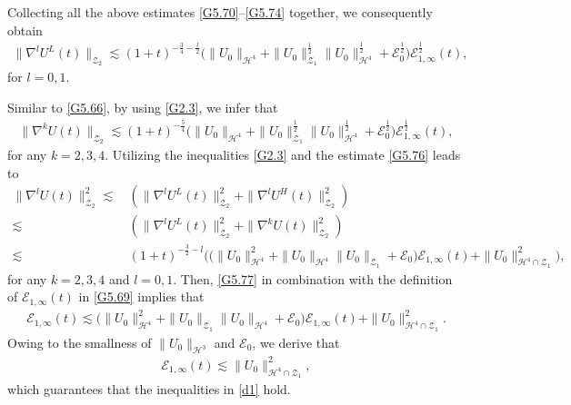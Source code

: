 \documentclass[reqno,11pt]{amsart}
\theoremstyle{plain}
\numberwithin{equation}{section}
\begin{document}
Collecting all the above estimates \eqref{G5.70}--\eqref{G5.74} together,
 we consequently obtain  
\begin{align}\label{G5.75}
\|\nabla^l U^L(t)\|_{\mathcal{Z}_2}\lesssim (1+t)^{-\frac{3}{4}-\frac{l}{2}} 
\big(\|U_0\|_{\mathcal{H}^4}
+\|U_0\|_{\mathcal{Z}_1}^{\frac{1}{2}}\|U_0\|_{\mathcal{H}^4}^{\frac{1}{2}}+\mathcal{E}^{\frac{1}{2}}_0  
 \big)\mathcal{E}^{\frac{1}{2}}_{1,\infty}(t),   
\end{align}
for $l=0,1$.

Similar to \eqref{G5.66}, by using \eqref{G2.3}, we   infer that
\begin{align}\label{G5.76}
\|\nabla^k U(t)\|_{\mathcal{Z}_2}\lesssim (1+t)^{-\frac{5}{4}}
 \big(\|U_0\|_{\mathcal{H}^4}+\|U_0\|_{\mathcal{Z}_1}^{\frac{1}{2}}
 \|U_0\|_{\mathcal{H}^4}^{\frac{1}{2}}+\mathcal{E}^{\frac{1}{2}}_0  
  \big)\mathcal{E}^{\frac{1}{2}}_{1,\infty}(t),   
\end{align}
for any $k=2,3,4$.
Utilizing the inequalities  \eqref{G2.3} and the estimate \eqref{G5.76} leads to  
\begin{align}\label{G5.77}
\|\nabla^l U(t)\|_{\mathcal{Z}_2}^2\lesssim \,
& (\|\nabla^l U^L(t)\|_{\mathcal{Z}_2}^2+\|\nabla^l U^H(t)\|_{\mathcal{Z}_2}^2)\nonumber\\
\lesssim\,&  (\|\nabla^l U^L(t)\|_{\mathcal{Z}_2}^2+\|\nabla^k U(t)\|_{\mathcal{Z}_2}^2)\nonumber\\
\lesssim\,& (1+t)^{-\frac{3}{2}-l}\big(\big(\|U_0\|_{\mathcal{H}^4}^2+\|U_0\|_{\mathcal{H}^4}\|U_0\|_{\mathcal{Z}_1} 
+\mathcal{E}_0    \big)\mathcal{E}_{1,\infty}(t)+\|U_0\|_{\mathcal{H}^4\cap{\mathcal{Z}_1}}^2  \big),
\end{align}
for any $k=2,3,4$ and $l=0,1$. Then,
\eqref{G5.77} in combination with   the definition of $\mathcal{E}_{1,\infty}(t)$   in \eqref{G5.69} implies that  
\begin{align*}
\mathcal{E}_{1,\infty}(t)\lesssim 
 \big(\|U_0\|_{\mathcal{H}^4}^2+\|U_0\|_{\mathcal{Z}_1}\|U_0\|_{\mathcal{H}^4}+\mathcal{E}_0 
    \big)\mathcal{E}_{1,\infty}(t)+\|U_0\|_{\mathcal{H}^4\cap{\mathcal{Z}_1}}^2  .   
\end{align*}
Owing to the smallness of $ \|U_0\|_{\mathcal{H}^3} $ and $ \mathcal{E}_0 $, we derive  that
\begin{align*}  
\mathcal{E}_{1,\infty}(t) \lesssim \|U_0\|_{\mathcal{H}^4 \cap \mathcal{Z}_1}^2,  
\end{align*}  
which guarantees that the inequalities in  \eqref{d1} hold.
\end{document}
